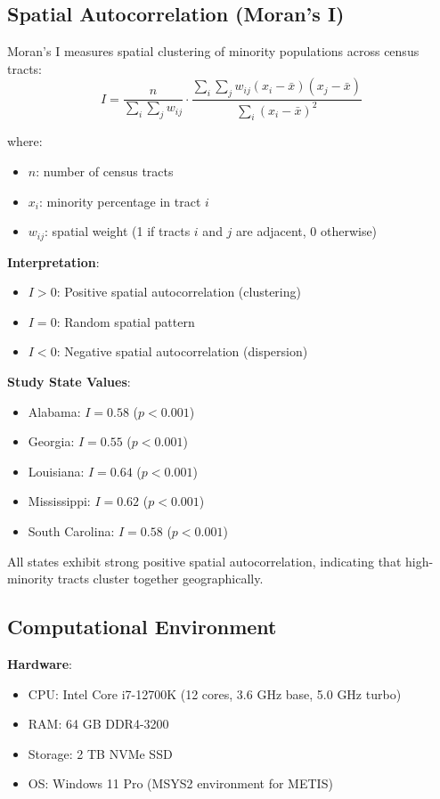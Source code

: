 {\subsection{Spatial Autocorrelation (Moran's I)}

Moran's I measures spatial clustering of minority populations across census tracts:
\[
I = \frac{n}{\sum_i \sum_j w_{ij}} \cdot \frac{\sum_i \sum_j w_{ij}(x_i - \bar{x})(x_j - \bar{x})}{\sum_i (x_i - \bar{x})^2}
\]

where:
\begin{itemize}
    \item $n$: number of census tracts
    \item $x_i$: minority percentage in tract $i$
    \item $w_{ij}$: spatial weight (1 if tracts $i$ and $j$ are adjacent, 0 otherwise)
\end{itemize}

\textbf{Interpretation}:
\begin{itemize}
    \item $I > 0$: Positive spatial autocorrelation (clustering)
    \item $I = 0$: Random spatial pattern
    \item $I < 0$: Negative spatial autocorrelation (dispersion)
\end{itemize}

\textbf{Study State Values}:
\begin{itemize}
    \item Alabama: $I = 0.58$ ($p < 0.001$)
    \item Georgia: $I = 0.55$ ($p < 0.001$)
    \item Louisiana: $I = 0.64$ ($p < 0.001$)
    \item Mississippi: $I = 0.62$ ($p < 0.001$)
    \item South Carolina: $I = 0.58$ ($p < 0.001$)
\end{itemize}

All states exhibit strong positive spatial autocorrelation, indicating that high-minority tracts cluster together geographically.

\subsection{Computational Environment}

\textbf{Hardware}:
\begin{itemize}
    \item CPU: Intel Core i7-12700K (12 cores, 3.6 GHz base, 5.0 GHz turbo)
    \item RAM: 64 GB DDR4-3200
    \item Storage: 2 TB NVMe SSD
    \item OS: Windows 11 Pro (MSYS2 environment for METIS)
\end{itemize}

}
